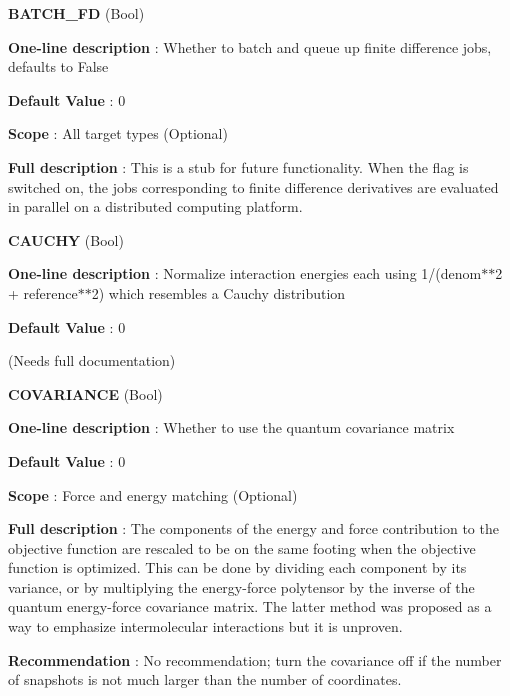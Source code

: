 \begin{DoxyItemize}
\item {\bfseries  B\-A\-T\-C\-H\-\_\-\-F\-D } (Bool) \par
{\bfseries  One-\/line description }\-: Whether to batch and queue up finite difference jobs, defaults to False \par
{\bfseries  Default Value }\-: 0 \par
{\bfseries  Scope }\-: All target types (Optional) \par
{\bfseries  Full description }\-: This is a stub for future functionality. When the flag is switched on, the jobs corresponding to finite difference derivatives are evaluated in parallel on a distributed computing platform.\end{DoxyItemize}
\begin{DoxyItemize}
\item {\bfseries  C\-A\-U\-C\-H\-Y } (Bool) \par
{\bfseries  One-\/line description }\-: Normalize interaction energies each using 1/(denom$\ast$$\ast$2 + reference$\ast$$\ast$2) which resembles a Cauchy distribution \par
{\bfseries  Default Value }\-: 0 \par
(Needs full documentation)\end{DoxyItemize}
\begin{DoxyItemize}
\item {\bfseries  C\-O\-V\-A\-R\-I\-A\-N\-C\-E } (Bool) \par
{\bfseries  One-\/line description }\-: Whether to use the quantum covariance matrix \par
{\bfseries  Default Value }\-: 0 \par
{\bfseries  Scope }\-: Force and energy matching (Optional) \par
{\bfseries  Full description }\-: The components of the energy and force contribution to the objective function are rescaled to be on the same footing when the objective function is optimized. This can be done by dividing each component by its variance, or by multiplying the energy-\/force polytensor by the inverse of the quantum energy-\/force covariance matrix. The latter method was proposed as a way to emphasize intermolecular interactions but it is unproven. \par
{\bfseries  Recommendation }\-: No recommendation; turn the covariance off if the number of snapshots is not much larger than the number of coordinates.\end{DoxyItemize}
